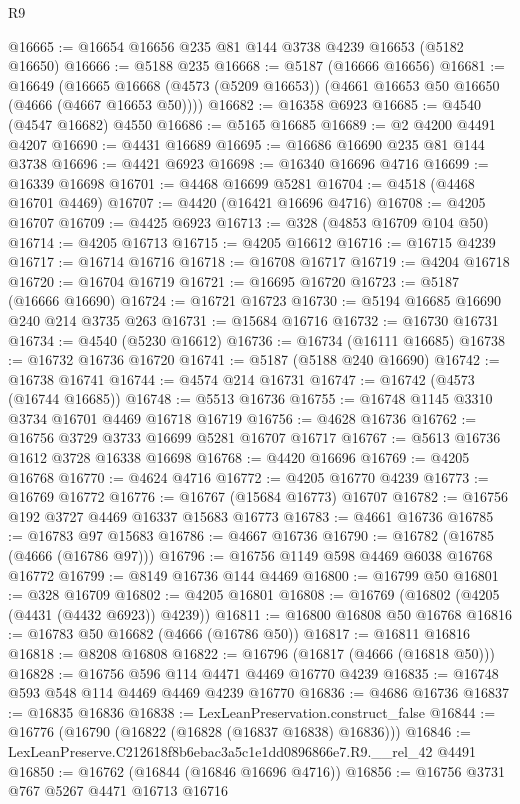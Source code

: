 \begin{lexlean}{R9}
\begin{coremodule}
@16665 := @16654 @16656 @235 @81 @144 @3738 @4239 @16653 (@5182 @16650)
@16666 := @5188 @235
@16668 := @5187 (@16666 @16656)
@16681 := @16649
    (@16665 @16668 (@4573 (@5209 @16653)) (@4661 @16653 @50 @16650 (@4666 (@4667 @16653 @50))))
@16682 := @16358 @6923
@16685 := @4540 (@4547 @16682) @4550
@16686 := @5165 @16685
@16689 := @2 @4200 @4491 @4207
@16690 := @4431 @16689
@16695 := @16686 @16690 @235 @81 @144 @3738
@16696 := @4421 @6923
@16698 := @16340 @16696 @4716
@16699 := @16339 @16698
@16701 := @4468 @16699 @5281
@16704 := @4518 (@4468 @16701 @4469)
@16707 := @4420 (@16421 @16696 @4716)
@16708 := @4205 @16707
@16709 := @4425 @6923
@16713 := @328 (@4853 @16709 @104 @50)
@16714 := @4205 @16713
@16715 := @4205 @16612
@16716 := @16715 @4239
@16717 := @16714 @16716
@16718 := @16708 @16717
@16719 := @4204 @16718
@16720 := @16704 @16719
@16721 := @16695 @16720
@16723 := @5187 (@16666 @16690)
@16724 := @16721 @16723
@16730 := @5194 @16685 @16690 @240 @214 @3735 @263
@16731 := @15684 @16716
@16732 := @16730 @16731
@16734 := @4540 (@5230 @16612)
@16736 := @16734 (@16111 @16685)
@16738 := @16732 @16736 @16720
@16741 := @5187 (@5188 @240 @16690)
@16742 := @16738 @16741
@16744 := @4574 @214 @16731
@16747 := @16742 (@4573 (@16744 @16685))
@16748 := @5513 @16736
@16755 := @16748 @1145 @3310 @3734 @16701 @4469 @16718 @16719
@16756 := @4628 @16736
@16762 := @16756 @3729 @3733 @16699 @5281 @16707 @16717
@16767 := @5613 @16736 @1612 @3728 @16338 @16698
@16768 := @4420 @16696
@16769 := @4205 @16768
@16770 := @4624 @4716
@16772 := @4205 @16770 @4239
@16773 := @16769 @16772
@16776 := @16767 (@15684 @16773) @16707
@16782 := @16756 @192 @3727 @4469 @16337 @15683 @16773
@16783 := @4661 @16736
@16785 := @16783 @97 @15683
@16786 := @4667 @16736
@16790 := @16782 (@16785 (@4666 (@16786 @97)))
@16796 := @16756 @1149 @598 @4469 @6038 @16768 @16772
@16799 := @8149 @16736 @144 @4469
@16800 := @16799 @50
@16801 := @328 @16709
@16802 := @4205 @16801
@16808 := @16769 (@16802 (@4205 (@4431 (@4432 @6923)) @4239))
@16811 := @16800 @16808 @50 @16768
@16816 := @16783 @50 @16682 (@4666 (@16786 @50))
@16817 := @16811 @16816
@16818 := @8208 @16808
@16822 := @16796 (@16817 (@4666 (@16818 @50)))
@16828 := @16756 @596 @114 @4471 @4469 @16770 @4239
@16835 := @16748 @593 @548 @114 @4469 @4469 @4239 @16770
@16836 := @4686 @16736
@16837 := @16835 @16836
@16838 := LexLeanPreservation.construct_false
@16844 := @16776 (@16790 (@16822 (@16828 (@16837 @16838) @16836)))
@16846 := LexLeanPreserve.C212618f8b6ebac3a5c1e1dd0896866e7.R9.__rel_42 @4491
@16850 := @16762 (@16844 (@16846 @16696 @4716))
@16856 := @16756 @3731 @767 @5267 @4471 @16713 @16716

\end{coremodule}
\end{lexlean}

